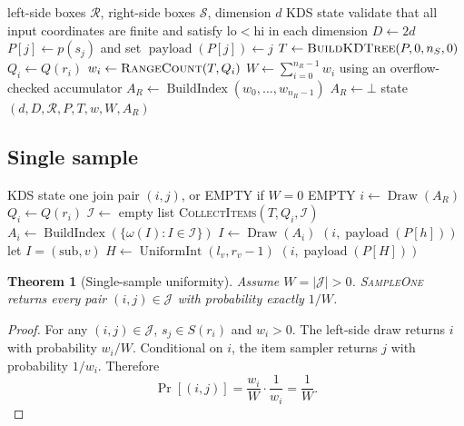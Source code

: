 \documentclass[11pt]{article}
\theoremstyle{definition}
\theoremstyle{plain}
\newtheorem{theorem}{Theorem}[section]
\theoremstyle{remark}
\DeclareMathOperator{\UniformInt}{UniformInt}
\DeclareMathOperator{\BuildIndex}{BuildIndex}
\DeclareMathOperator{\Draw}{Draw}
\DeclareMathOperator{\payload}{payload}
\newcommand{\Rrel}{\mathcal R}
\newcommand{\Srel}{\mathcal S}
\newcommand{\Jset}{\mathcal J}
\newcommand{\Items}{\mathcal I}
\newcommand{\lo}{\mathrm{lo}}
\newcommand{\hi}{\mathrm{hi}}
\newcommand{\pt}{\mathrm{pt}}
\newcommand{\sub}{\mathrm{sub}}
\newcommand{\nil}{\bot}
\begin{document}
\begin{algorithm}[htbp]
\caption{\textsc{BuildKDS}$(\Rrel,\Srel,d)$}
\begin{algorithmic}[1]
\Require left-side boxes $\Rrel$, right-side boxes $\Srel$, dimension $d$
\Ensure KDS state
\State validate that all input coordinates are finite and satisfy $\lo<\hi$ in each dimension
\State $D\gets 2d$
  \State $P[j]\gets p(s_j)$ and set $\payload(P[j])\gets j$
\EndFor
\State $T\gets\textsc{BuildKDTree}(P,0,n_S,0)$
  \State $Q_i\gets Q(r_i)$
  \State $w_i\gets\textsc{RangeCount}(T,Q_i)$
\EndFor
\State $W\gets \sum_{i=0}^{n_R-1}w_i$ using an overflow-checked accumulator
  \State $A_R\gets\BuildIndex(w_0,\ldots,w_{n_R-1})$
\Else
  \State $A_R\gets\nil$
\EndIf
\State \Return state $(d,D,\Rrel,P,T,w,W,A_R)$
\end{algorithmic}
\end{algorithm}

\subsection{Single sample}

\begin{algorithm}[htbp]
\caption{\textsc{SampleOne}$(\mathrm{state})$}
\begin{algorithmic}[1]
\Require KDS state
\Ensure one join pair $(i,j)$, or EMPTY if $W=0$
  \State \Return EMPTY
\EndIf
\State $i\gets\Draw(A_R)$
\State $Q_i\gets Q(r_i)$
\State $\Items\gets$ empty list
\State \textsc{CollectItems}$(T,Q_i,\Items)$
\State $A_i\gets\BuildIndex(\{\omega(I):I\in\Items\})$
\State $I\gets\Draw(A_i)$
\If{$I=(\pt,h)$}
  \State \Return $(i,\payload(P[h]))$
\Else
  \State let $I=(\sub,v)$
  \State $H\gets\UniformInt(l_v,r_v-1)$
  \State \Return $(i,\payload(P[H]))$
\EndIf
\end{algorithmic}
\end{algorithm}

\begin{theorem}[Single-sample uniformity]
Assume $W=|\Jset|>0$.  \textsc{SampleOne} returns every pair $(i,j)\in\Jset$ with
probability exactly $1/W$.
\end{theorem}

\begin{proof}
For any $(i,j)\in\Jset$, $s_j\in S(r_i)$ and $w_i>0$.  The left-side draw returns $i$ with
probability $w_i/W$.  Conditional on $i$, the item sampler returns $j$ with probability
$1/w_i$.  Therefore
\[
  \Pr[(i,j)] = \frac{w_i}{W}\cdot\frac{1}{w_i} = \frac{1}{W}.
\]
\end{proof}
\end{document}
